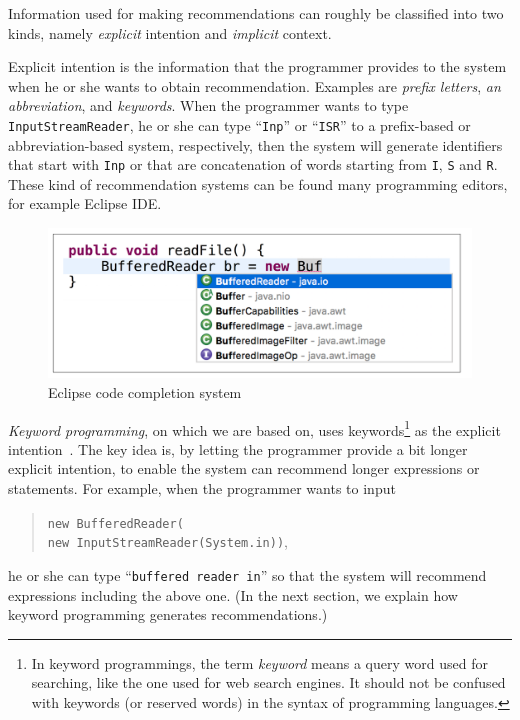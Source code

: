 \documentclass[PRO,english]{ipsj}
\begin{document}
Information used for making recommendations can roughly be classified into two kinds, namely \emph{explicit} intention and \emph{implicit} context.  

Explicit intention is the information that the programmer provides to the system when he or she wants to obtain recommendation.  Examples are \emph{prefix letters}, \emph{an abbreviation}, and \emph{keywords}.  When the programmer wants to type \texttt{InputStreamReader}, he or she can type ``\texttt{Inp}'' or ``\texttt{ISR}'' to a prefix-based or abbreviation-based system, respectively, then the system will generate identifiers that start with \texttt{Inp} or that are concatenation of words starting from \texttt{I}, \texttt{S} and \texttt{R}.  These kind of recommendation systems can be found many programming editors, for example Eclipse IDE.

\begin{figure}[!ht]
\centering
\includegraphics[scale=0.38]{Figure/Eclipse.pdf}
\caption{Eclipse code completion system}
\label{fig:Eclipse}
\end{figure}


\emph{Keyword programming}, on which we are based on,  uses keywords\footnote{In keyword programmings, the term \emph{keyword} means a query word used for searching, like the one used for web search engines.  It should not be confused with keywords (or reserved words) in the syntax of programming languages.} as the explicit intention~\cite{little2009keyword}.  The key idea is, by letting the programmer provide a bit longer explicit intention, to enable the system can recommend longer expressions or statements.  For example, when the programmer wants to input
\begin{quote}
  \texttt{new BufferedReader(\\
    \qquad{}new InputStreamReader(System.in))},   
\end{quote}
he or she can type ``\texttt{buffered reader in}'' so that the system will recommend expressions including the above one.  (In the next section, we explain how keyword programming generates recommendations.)
\end{document}
